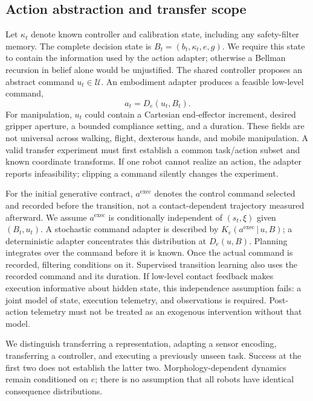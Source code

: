 \documentclass[11pt]{article}
\newcommand{\given}{\,\vert\,}
\begin{document}
\subsection{Action abstraction and transfer scope}
Let $\kappa_t$ denote known controller and calibration state, including any safety-filter memory. The complete decision state is $B_t=(b_t,\kappa_t,e,g)$. We require this state to contain the information used by the action adapter; otherwise a Bellman recursion in belief alone would be unjustified. The shared controller proposes an abstract command $u_t\in\mathcal U$. An embodiment adapter produces a feasible low-level command,
\begin{equation}
a_t=D_e(u_t,B_t).
\end{equation}
For manipulation, $u_t$ could contain a Cartesian end-effector increment, desired gripper aperture, a bounded compliance setting, and a duration. These fields are not universal across walking, flight, dexterous hands, and mobile manipulation. A valid transfer experiment must first establish a common task/action subset and known coordinate transforms. If one robot cannot realize an action, the adapter reports infeasibility; clipping a command silently changes the experiment.

For the initial generative contract, $a^{\mathrm{exec}}$ denotes the control command selected and recorded before the transition, not a contact-dependent trajectory measured afterward. We assume $a^{\mathrm{exec}}$ is conditionally independent of $(s_t,\xi)$ given $(B_t,u_t)$. A stochastic command adapter is described by $K_e(a^{\mathrm{exec}}\given u,B)$; a deterministic adapter concentrates this distribution at $D_e(u,B)$. Planning integrates over the command before it is known. Once the actual command is recorded, filtering conditions on it. Supervised transition learning also uses the recorded command and its duration. If low-level contact feedback makes execution informative about hidden state, this independence assumption fails: a joint model of state, execution telemetry, and observations is required. Post-action telemetry must not be treated as an exogenous intervention without that model.

We distinguish transferring a representation, adapting a sensor encoding, transferring a controller, and executing a previously unseen task. Success at the first two does not establish the latter two. Morphology-dependent dynamics remain conditioned on $e$; there is no assumption that all robots have identical consequence distributions.
\end{document}
